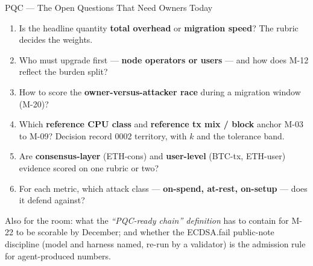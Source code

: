 \documentclass[aspectratio=169,10pt]{beamer}
\begin{document}
\begin{frame}{PQC --- The Open Questions That Need Owners Today}
  \begin{enumerate}\small
    \item Is the headline quantity \textbf{total overhead} or \textbf{migration speed}? The rubric decides the weights.
    \item Who must upgrade first --- \textbf{node operators or users} --- and how does M-12 reflect the burden split?
    \item How to score the \textbf{owner-versus-attacker race} during a migration window (M-20)?
    \item Which \textbf{reference CPU class} and \textbf{reference tx mix / block} anchor M-03 to M-09? Decision record 0002 territory, with $k$ and the tolerance band.
    \item Are \textbf{consensus-layer} (ETH-cons) and \textbf{user-level} (BTC-tx, ETH-user) evidence scored on one rubric or two?
    \item For each metric, which attack class --- \textbf{on-spend, at-rest, on-setup} --- does it defend against?
  \end{enumerate}
  \par\vspace{1mm}
  {\small Also for the room: what the \emph{``PQC-ready chain'' definition} has to contain for M-22 to be scorable by December; and whether the ECDSA.fail public-note discipline (model and harness named, re-run by a validator) is the admission rule for agent-produced numbers.}
\end{frame}
\end{document}
